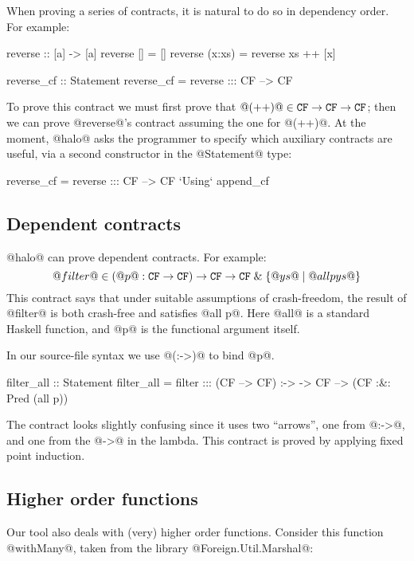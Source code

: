 When proving a series of contracts, it is natural to do so in dependency order.
For example:
\begin{code}
  reverse :: [a] -> [a]
  reverse [] = []
  reverse (x:xs) = reverse xs ++ [x]

  reverse_cf :: Statement
  reverse_cf = reverse ::: CF --> CF
\end{code}
To prove this contract we must first prove that
$@(++)@ \in {\tt CF} \rightarrow {\tt CF} \rightarrow {\tt CF}$;
then we can prove @reverse@'s contract assuming the one for @(++)@.
At the moment, @halo@ asks the programmer to specify which auxiliary contracts
are useful, via a second constructor in the @Statement@ type:
\begin{code}
  reverse_cf = reverse ::: CF --> CF
                       `Using` append_cf
\end{code}


\subsection{Dependent contracts}

@halo@ can prove dependent contracts.
For example:
$$
@filter@ \in (@p@ : {\tt CF} \rightarrow {\tt CF}) \rightarrow
             {\tt CF} \rightarrow {\tt CF} \;\&\; \{@ys@ \mid @all p ys@ \}
$$
This contract says that under suitable assumptions of crash-freedom,
the result of @filter@ is both crash-free and satisfies @all p@.
Here @all@ is a standard Haskell function, and @p@ is the functional
argument itself.

In our source-file syntax we use @(:->)@ to bind @p@.
\begin{code}
filter_all :: Statement
filter_all = 
  filter ::: (CF --> CF) :-> \p ->
                CF --> (CF :&: Pred (all p))
\end{code}
The contract looks slightly confusing since it uses two ``arrows'', one from @:->@,
and one from the @->@ in the lambda.  This contract is proved by
applying fixed point induction.

\subsection{Higher order functions}

Our tool also deals with (very) higher order functions.
Consider this function @withMany@, taken from the
library @Foreign.Util.Marshal@:

